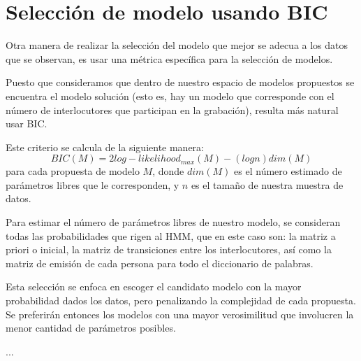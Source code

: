 \section{Selección de modelo usando BIC}

Otra manera de realizar la selección del modelo que mejor se adecua a los datos que se observan, es usar una métrica específica para la selección de modelos.


Puesto que consideramos que dentro de nuestro espacio de modelos propuestos se encuentra el modelo solución (esto es, hay un modelo que corresponde con el número de interlocutores que participan en la grabación), resulta más natural usar \ac{BIC}.

Este criterio se calcula de la siguiente manera: 
\begin{equation}
BIC(M) = 2 log-likelihood_{max}(M) - (log n ) dim(M)
\end{equation}
para cada propuesta de modelo $M$, donde $dim(M)$ es el número estimado de parámetros libres que le corresponden, y $n$ es el tamaño de nuestra muestra de datos.

Para estimar el número de parámetros libres de nuestro modelo, se consideran todas las probabilidades que rigen al \ac{HMM}, que en este caso son: la matriz a priori o inicial, la matriz de transiciones entre los interlocutores, así como la matriz de emisión de cada persona para todo el diccionario de palabras.

Esta selección se enfoca en escoger el candidato modelo con la mayor probabilidad dados los datos, pero penalizando la complejidad de cada propuesta. Se preferirán entonces los modelos con una mayor verosimilitud que involucren la menor cantidad de parámetros posibles. 

...